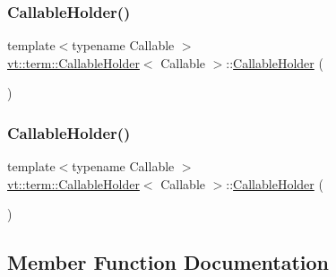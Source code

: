 \subsubsection{\texorpdfstring{Callable\+Holder()}{CallableHolder()}\hspace{0.1cm}{\footnotesize\ttfamily [2/3]}}
{\footnotesize\ttfamily template$<$typename Callable $>$ \\
\hyperlink{structvt_1_1term_1_1_callable_holder}{vt\+::term\+::\+Callable\+Holder}$<$ Callable $>$\+::\hyperlink{structvt_1_1term_1_1_callable_holder}{Callable\+Holder} (\begin{DoxyParamCaption}\item[{\hyperlink{structvt_1_1term_1_1_callable_holder}{Callable\+Holder}$<$ Callable $>$ const \&}]{ }\end{DoxyParamCaption})\hspace{0.3cm}{\ttfamily [delete]}}

\mbox{\label{structvt_1_1term_1_1_callable_holder_a02091f8787e03f8e29a9e78a975b86d4}} 
\subsubsection{\texorpdfstring{Callable\+Holder()}{CallableHolder()}\hspace{0.1cm}{\footnotesize\ttfamily [3/3]}}
{\footnotesize\ttfamily template$<$typename Callable $>$ \\
\hyperlink{structvt_1_1term_1_1_callable_holder}{vt\+::term\+::\+Callable\+Holder}$<$ Callable $>$\+::\hyperlink{structvt_1_1term_1_1_callable_holder}{Callable\+Holder} (\begin{DoxyParamCaption}\item[{\hyperlink{structvt_1_1term_1_1_callable_holder}{Callable\+Holder}$<$ Callable $>$ \&\&}]{ }\end{DoxyParamCaption})\hspace{0.3cm}{\ttfamily [default]}}



\subsection{Member Function Documentation}
\mbox{\label{structvt_1_1term_1_1_callable_holder_a33bc8b5d543eb4338c257522cc0084f1}} 
